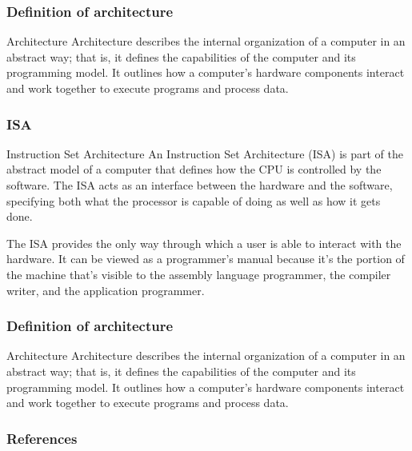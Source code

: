\documentclass[aspectratio=169]{beamer}
\begin{document}
\begin{frame}
  \frametitle{Definition of architecture}
    \begin{block}{Architecture}
      Architecture describes the internal organization of a computer in an abstract way; that is, it deﬁnes the capabilities of the computer and its programming model.\cite{clements} It outlines how a computer's hardware components interact and work together to execute programs and process data.   
    \end{block}
  \end{frame}

\begin{frame}
  \frametitle{ISA}
    \begin{block}{Instruction Set Architecture}
      An Instruction Set Architecture (ISA) is part of the abstract model of a computer that defines how the CPU is controlled by the software. The ISA acts as an interface between the hardware and the software, specifying both what the processor is capable of doing as well as how it gets done. \cite{clements}
    \end{block}
    The ISA provides the only way through which a user is able to interact with the hardware. It can be viewed as a programmer's manual because it's the portion of the machine that's visible to the assembly language programmer, the compiler writer, and the application programmer. 
  \end{frame}

\begin{frame}
  \frametitle{Definition of architecture}
    \begin{block}{Architecture}
      Architecture describes the internal organization of a computer in an abstract way; that is, it deﬁnes the capabilities of the computer and its programming model.\cite{clements} It outlines how a computer's hardware components interact and work together to execute programs and process data.   
    \end{block}
  \end{frame}

\begin{frame}
    \frametitle{References}
    \printbibliography
\end{frame}
\end{document}
